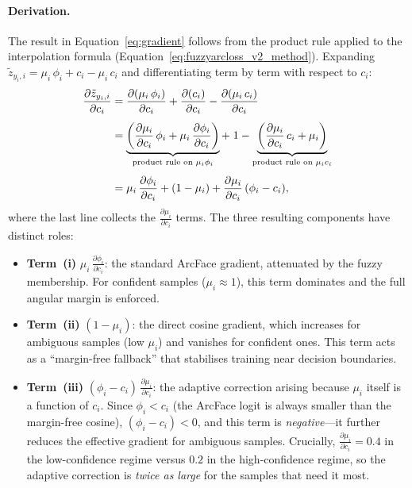 \paragraph{Derivation.}
The result in Equation~\ref{eq:gradient} follows from the product rule
applied to the interpolation formula
(Equation~\ref{eq:fuzzyarcloss_v2_method}).
Expanding $\tilde{z}_{y_i,i} = \mu_i \, \phi_i + c_i - \mu_i \, c_i$
and differentiating term by term with respect to $c_i$:
\begin{align}
\frac{\partial \tilde{z}_{y_i,i}}{\partial c_i}
&= \frac{\partial(\mu_i \, \phi_i)}{\partial c_i}
 + \frac{\partial(c_i)}{\partial c_i}
 - \frac{\partial(\mu_i \, c_i)}{\partial c_i} \notag \\[4pt]
&= \underbrace{\left(\frac{\partial \mu_i}{\partial c_i}\,\phi_i
   + \mu_i\,\frac{\partial \phi_i}{\partial c_i}\right)}_{\text{product rule on }\mu_i\phi_i}
 + \; 1
 - \underbrace{\left(\frac{\partial \mu_i}{\partial c_i}\,c_i
   + \mu_i\right)}_{\text{product rule on }\mu_i c_i} \notag \\[4pt]
&= \mu_i \, \frac{\partial \phi_i}{\partial c_i}
 + (1 - \mu_i)
 + \frac{\partial \mu_i}{\partial c_i}\,(\phi_i - c_i),
\label{eq:gradient_derived}
\end{align}
where the last line collects the $\frac{\partial \mu_i}{\partial c_i}$
terms.
The three resulting components have distinct roles:
\begin{itemize}
    \item \textbf{Term~(i)} $\mu_i \, \frac{\partial \phi_i}{\partial c_i}$:
    the standard ArcFace gradient, attenuated by the fuzzy membership.
    For confident samples ($\mu_i \approx 1$), this term dominates and
    the full angular margin is enforced.
    \item \textbf{Term~(ii)} $(1 - \mu_i)$:
    the direct cosine gradient, which increases for ambiguous samples
    (low $\mu_i$) and vanishes for confident ones.
    This term acts as a ``margin-free fallback'' that stabilises training
    near decision boundaries.
    \item \textbf{Term~(iii)} $(\phi_i - c_i)\,\frac{\partial \mu_i}{\partial c_i}$:
    the adaptive correction arising because $\mu_i$ itself is a function
    of $c_i$.
    Since $\phi_i < c_i$ (the ArcFace logit is always smaller than the
    margin-free cosine), $(\phi_i - c_i) < 0$, and this term is
    \emph{negative}---it further reduces the effective gradient for
    ambiguous samples.
    Crucially, $\frac{\partial \mu_i}{\partial c_i} = 0.4$ in the
    low-confidence regime versus $0.2$ in the high-confidence regime,
    so the adaptive correction is \emph{twice as large} for the samples
    that need it most.
\end{itemize}

